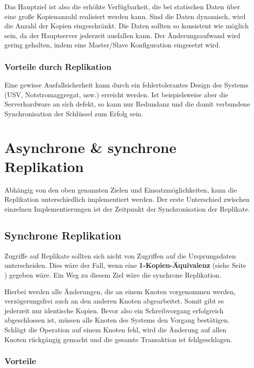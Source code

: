 Das Hauptziel ist also die erhöhte Verfügbarkeit, die bei statischen Daten über eine große Kopienanzahl realisiert werden kann. Sind die Daten dynamisch, wird die Anzahl der Kopien eingeschränkt. Die Daten sollten so konsistent wie möglich sein, da der Hauptserver jederzeit ausfallen kann. Der Änderungsaufwand wird gering gehalten, indem eine Master/Slave Konfiguration eingesetzt wird.

\subsubsection{Vorteile durch Replikation}

Eine gewisse Ausfallsicherheit kann durch ein fehlertolerantes Design des Systems (USV, Notstromaggregat, usw.) erreicht werden. Ist beispielsweise aber die Serverhardware an sich defekt, so kann nur Redundanz und die damit verbundene Synchronisation der Schlüssel zum Erfolg sein.

\section{Asynchrone \& synchrone Replikation}

Abhängig von den oben genannten Zielen und Einsatzmöglichkeiten, kann die Replikation unterschiedlich implementiert werden. Der erste Unterschied zwischen einzelnen Implementierungen ist der Zeitpunkt der Synchronisation der Replikate.

\subsection{Synchrone Replikation}

Zugriffe auf Replikate sollten sich nicht von Zugriffen auf die Ursprungsdaten unterscheiden. Dies wäre der Fall, wenn eine \textbf{1-Kopien-Äquivalenz} (siehe Seite \pageref{aequivalenz}) gegeben wäre. Ein Weg zu diesem Ziel wäre die synchrone Replikation. \cite{darmstadt}

Hierbei werden alle Änderungen, die an einem Knoten vorgenommen werden, verzögerungsfrei auch an den anderen Knoten abgearbeitet. Somit gibt es jederzeit nur identische Kopien. Bevor also ein Schreibvorgang erfolgreich abgeschlossen ist, müssen alle Knoten des Systems den Vorgang bestätigen. Schlägt die Operation auf einem Knoten fehl, wird die Änderung auf allen Knoten rückgängig gemacht und die gesamte Transaktion ist fehlgeschlagen. \cite{leipzig}

\subsubsection{Vorteile}

